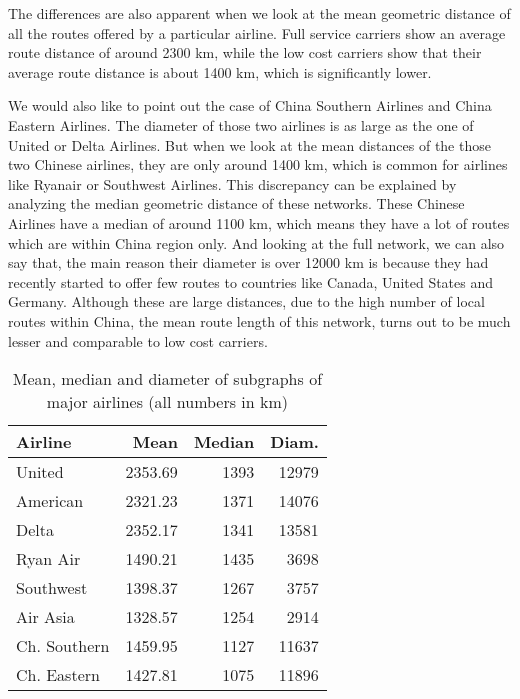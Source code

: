 \documentclass[twocolumn]{tum-article}
\begin{document}
The differences are also apparent when we look at the mean geometric distance of all the routes offered by a particular airline.
Full service carriers show an average route distance of around 2300 km, while the low cost carriers show that their average route distance is about 1400 km, which is significantly lower.


We would also like to point out the case of China Southern Airlines and China Eastern Airlines.
The diameter of those two airlines is as large as the one of United or Delta Airlines. 
But when we look at the mean distances of the those two Chinese airlines, they are only around 1400 km, which is common for airlines like Ryanair or Southwest Airlines.
This discrepancy can be explained by analyzing the median geometric distance of these networks.
These Chinese Airlines have a median of around 1100 km, which means they have a lot of routes which are within China region only. 
And looking at the full network, we can also say that, the main reason their diameter is over 12000 km is because they had recently started to offer few routes to countries like Canada, United States and Germany.
Although these are large distances, due to the high number of local routes within China, the mean route length of this network, turns out to be much lesser and comparable to low cost carriers. 

\begin{table}[ht]
\begin{center}
 \begin{tabular}{| l | r | r | r |}
 \hline
 \textbf{Airline} & \textbf{Mean} & \textbf{Median} & \textbf{Diam.} \\ 
 \hline
 United & 2353.69 & 1393 & 12979 \\
 \hline   
 American & 2321.23 & 1371 & 14076 \\
 \hline   
 Delta & 2352.17 & 1341 & 13581 \\
 \hline   
 Ryan Air & 1490.21 & 1435 & 3698 \\
 \hline   
 Southwest & 1398.37 & 1267 & 3757 \\
 \hline   
 Air Asia & 1328.57 & 1254 & 2914 \\
 \hline   
 Ch. Southern & 1459.95 & 1127 & 11637 \\
 \hline   
 Ch. Eastern & 1427.81 & 1075 & 11896 \\
 \hline
 \end{tabular}
\caption{Mean, median and diameter of subgraphs of major airlines (all numbers in km)}
\label{Tab:distance_airlines}
\end{center}
\end{table}
\end{document}

